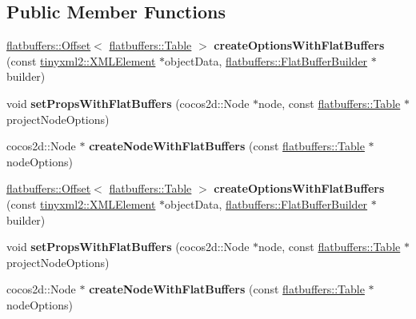 \subsection*{Public Member Functions}
\begin{DoxyCompactItemize}
\item 
\mbox{\label{classcocostudio_1_1ProjectNodeReader_adb294c068cabcad0f7070d9d6af02ee2}} 
\hyperlink{structflatbuffers_1_1Offset}{flatbuffers\+::\+Offset}$<$ \hyperlink{classflatbuffers_1_1Table}{flatbuffers\+::\+Table} $>$ {\bfseries create\+Options\+With\+Flat\+Buffers} (const \hyperlink{classtinyxml2_1_1XMLElement}{tinyxml2\+::\+X\+M\+L\+Element} $\ast$object\+Data, \hyperlink{classflatbuffers_1_1FlatBufferBuilder}{flatbuffers\+::\+Flat\+Buffer\+Builder} $\ast$builder)
\item 
\mbox{\label{classcocostudio_1_1ProjectNodeReader_ac763054673c420f0abf1bd9ddadf41b3}} 
void {\bfseries set\+Props\+With\+Flat\+Buffers} (cocos2d\+::\+Node $\ast$node, const \hyperlink{classflatbuffers_1_1Table}{flatbuffers\+::\+Table} $\ast$project\+Node\+Options)
\item 
\mbox{\label{classcocostudio_1_1ProjectNodeReader_af95a6c7cc328da9d5d21c2bd3906a063}} 
cocos2d\+::\+Node $\ast$ {\bfseries create\+Node\+With\+Flat\+Buffers} (const \hyperlink{classflatbuffers_1_1Table}{flatbuffers\+::\+Table} $\ast$node\+Options)
\item 
\mbox{\label{classcocostudio_1_1ProjectNodeReader_a82c6972c16a0ed7a6e898ed908f19be6}} 
\hyperlink{structflatbuffers_1_1Offset}{flatbuffers\+::\+Offset}$<$ \hyperlink{classflatbuffers_1_1Table}{flatbuffers\+::\+Table} $>$ {\bfseries create\+Options\+With\+Flat\+Buffers} (const \hyperlink{classtinyxml2_1_1XMLElement}{tinyxml2\+::\+X\+M\+L\+Element} $\ast$object\+Data, \hyperlink{classflatbuffers_1_1FlatBufferBuilder}{flatbuffers\+::\+Flat\+Buffer\+Builder} $\ast$builder)
\item 
\mbox{\label{classcocostudio_1_1ProjectNodeReader_ac763054673c420f0abf1bd9ddadf41b3}} 
void {\bfseries set\+Props\+With\+Flat\+Buffers} (cocos2d\+::\+Node $\ast$node, const \hyperlink{classflatbuffers_1_1Table}{flatbuffers\+::\+Table} $\ast$project\+Node\+Options)
\item 
\mbox{\label{classcocostudio_1_1ProjectNodeReader_aa3f325e6b62fcdbb493460d8413ea7e8}} 
cocos2d\+::\+Node $\ast$ {\bfseries create\+Node\+With\+Flat\+Buffers} (const \hyperlink{classflatbuffers_1_1Table}{flatbuffers\+::\+Table} $\ast$node\+Options)
\end{DoxyCompactItemize}
